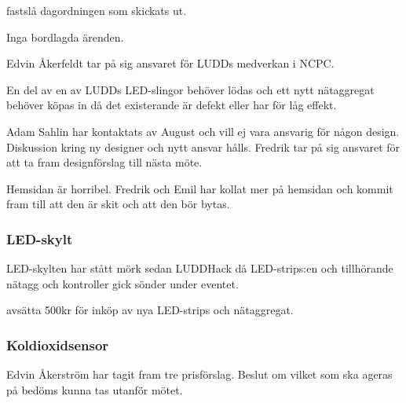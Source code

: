 \documentclass{protokoll}
\begin{document}
\newpage  


\begin{beslut}
     \att fastslå dagordningen som skickats ut.
\end{beslut}

Inga bordlagda ärenden.

Edvin Åkerfeldt tar på sig ansvaret för LUDDs medverkan i NCPC.

En del av en av LUDDs LED-slingor behöver lödas och ett nytt nätaggregat behöver köpas in då det existerande är defekt eller har för låg effekt. 

Adam Sahlin har kontaktats av August och vill ej vara ansvarig för någon design. Diskussion kring ny designer och nytt ansvar hålls. 
Fredrik tar på sig ansvaret för att ta fram designförslag till nästa möte. 

Hemsidan är horribel. Fredrik och Emil har kollat mer på hemsidan och kommit fram till att den är skit och att den bör bytas. 

\subsubsection{LED-skylt}
LED-skylten har stått mörk sedan LUDDHack då LED-strips:en och tillhörande nätagg och kontroller gick sönder under eventet. 
\begin{beslut}
    \att avsätta 500kr för inköp av nya LED-strips och nätaggregat.
\end{beslut}

\subsubsection{Koldioxidsensor}
Edvin Åkerström har tagit fram tre prisförslag. Beslut om vilket som ska ageras på bedöms kunna tas utanför mötet. 
\end{document}
